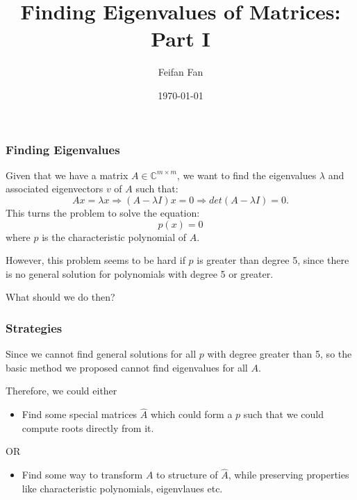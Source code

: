 \documentclass{beamer}
\title[Computational Linear Algebra]{Finding Eigenvalues of Matrices: Part I} %
\author{Feifan Fan} %
\institute[Imperial College London] %
{
Imperial College London \\ %
\medskip
\textit{feifan.fan19@imperial.ac.uk} %
}
\date{\today} %
\begin{document}
\begin{frame}
\titlepage %
\end{frame}




\begin{frame}
\frametitle{Finding Eigenvalues}
Given that we have a matrix \(A \in \mathbb{C}^{m \times m}\), we want to find the eigenvalues \(\lambda \) and associated eigenvectors \(v\)  of \(A\) such that:
\[
    Ax = \lambda x \Rightarrow (A - \lambda I)x = 0 \Rightarrow det(A - \lambda I) = 0
.\]
This turns the problem to solve the equation:
\[
    p(x) = 0
\]
where \(p\) is the characteristic polynomial of \(A\). \medskip

\noindent However, this problem seems to be hard if \(p\) is greater than degree 5, since there is no general solution for polynomials with degree 5 or greater. \medskip

\noindent What should we do then?
\end{frame}


\begin{frame}
\frametitle{Strategies}
Since we cannot find general solutions for all \(p\) with degree greater than 5, so the basic method we proposed cannot find eigenvalues for all \(A\). \medskip

\noindent Therefore, we could either 
\begin{itemize}
\item Find some special matrices \(\hat{A}\) which could form a \(p\) such that we could compute roots directly from it.
\end{itemize}
OR
\begin{itemize}
    \item Find some way to transform \(A\) to structure of \(\hat{A}\), while preserving properties like characteristic polynomials, eigenvlaues etc.  
\end{itemize}
\end{frame}
\end{document}
